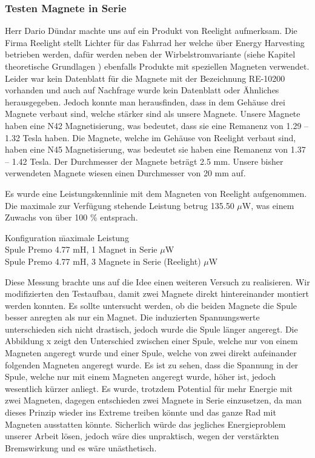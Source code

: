 \subsubsection{Testen Magnete in Serie}

Herr Dario Dündar machte uns auf ein Produkt von Reelight aufmerksam. Die Firma Reelight stellt Lichter für das Fahrrad her welche über Energy Harvesting betrieben werden, dafür werden neben der Wirbelstromvariante (siehe Kapitel theoretische Grundlagen ) ebenfalls Produkte mit speziellen Magneten verwendet. Leider war kein Datenblatt für die Magnete mit der Bezeichnung RE-10200 vorhanden und auch auf Nachfrage wurde kein Datenblatt oder Ähnliches herausgegeben. Jedoch konnte man herausfinden, dass in dem Gehäuse drei Magnete verbaut sind, welche stärker sind als unsere Magnete. Unsere Magnete haben eine N42 Magnetisierung, was bedeutet, dass sie eine Remanenz von 1.29 – 1.32 Tesla haben. Die Magnete, welche im Gehäuse von Reelight verbaut sind, haben eine N45 Magnetisierung, was bedeutet sie haben eine Remanenz von 1.37 – 1.42 Tesla. Der Durchmesser der Magnete beträgt 2.5 mm. Unsere bisher verwendeten Magnete wiesen einen Durchmesser von 20 mm auf. 

Es wurde eine Leistungskennlinie mit dem Magneten von Reelight aufgenommen. Die maximale zur Verfügung stehende Leistung betrug 135.50 $\mu$W, was einem Zuwachs von über 100 \% entsprach.

\begin{tabbing}
    Konfiguration\hphantom{4.77 mH, 3 Magnete in Serie (Reelight)}   \quad\= maximale Leistung    \\[0.8ex]
    Spule Premo 4.77 mH, 1 Magnet in Serie         $\mu$W\\
	Spule Premo 4.77 mH, 3 Magnete in Serie (Reelight)         $\mu$W
\end{tabbing}

Diese Messung brachte uns auf die Idee einen weiteren Versuch zu realisieren. Wir modifizierten den Testaufbau, damit zwei Magnete direkt hintereinander montiert werden konnten. Es sollte untersucht werden, ob die beiden Magnete die Spule besser anregten als nur ein Magnet. Die induzierten Spannungswerte unterschieden sich nicht drastisch, jedoch wurde die Spule länger angeregt. Die Abbildung x zeigt den Unterschied zwischen einer Spule, welche nur von einem Magneten angeregt wurde und einer Spule, welche von zwei direkt aufeinander folgenden Magneten angeregt wurde. Es ist zu sehen, dass die Spannung in der Spule, welche nur mit einem Magneten angeregt wurde, höher ist, jedoch wesentlich kürzer anliegt. Es wurde, trotzdem Potential für mehr Energie mit zwei Magneten, dagegen entschieden zwei Magnete in Serie einzusetzen, da man dieses Prinzip wieder ins Extreme treiben könnte und das ganze Rad mit Magneten ausstatten könnte. Sicherlich würde das jegliches Energieproblem unserer Arbeit lösen, jedoch wäre dies unpraktisch, wegen der verstärkten Bremswirkung und es wäre unästhetisch.


